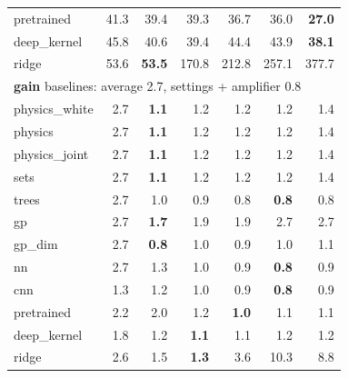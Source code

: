 \begin{tabular}{lrrrrrr}
pretrained & 41.3 & 39.4 & 39.3 & 36.7 & 36.0 & \textbf{27.0} \\
deep\_kernel & 45.8 & 40.6 & 39.4 & 44.4 & 43.9 & \textbf{38.1} \\
ridge & 53.6 & \textbf{53.5} & 170.8 & 212.8 & 257.1 & 377.7 \\
\midrule
\multicolumn{7}{l}{\textbf{gain} \quad baselines: average 2.7, settings + amplifier 0.8} \\ \midrule
physics\_white & 2.7 & \textbf{1.1} & 1.2 & 1.2 & 1.2 & 1.4 \\
physics & 2.7 & \textbf{1.1} & 1.2 & 1.2 & 1.2 & 1.4 \\
physics\_joint & 2.7 & \textbf{1.1} & 1.2 & 1.2 & 1.2 & 1.4 \\
sets & 2.7 & \textbf{1.1} & 1.2 & 1.2 & 1.2 & 1.4 \\
trees & 2.7 & 1.0 & 0.9 & 0.8 & \textbf{0.8} & 0.8 \\
gp & 2.7 & \textbf{1.7} & 1.9 & 1.9 & 2.7 & 2.7 \\
gp\_dim & 2.7 & \textbf{0.8} & 1.0 & 0.9 & 1.0 & 1.1 \\
nn & 2.7 & 1.3 & 1.0 & 0.9 & \textbf{0.8} & 0.9 \\
cnn & 1.3 & 1.2 & 1.0 & 0.9 & \textbf{0.8} & 0.9 \\
pretrained & 2.2 & 2.0 & 1.2 & \textbf{1.0} & 1.1 & 1.1 \\
deep\_kernel & 1.8 & 1.2 & \textbf{1.1} & 1.1 & 1.2 & 1.2 \\
ridge & 2.6 & 1.5 & \textbf{1.3} & 3.6 & 10.3 & 8.8 \\
\bottomrule
\end{tabular}

